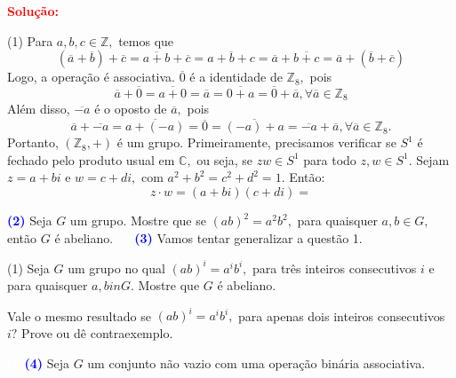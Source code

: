 \documentclass[12pt, a4paper]{article}
\newcommand{\negrito}[1]{\mbox{\boldmath{$#1$}}}
\begin{document}
\textbf{\textcolor{red}{Solução:}} 
\begin{tasks}[counter-format={(tsk[a])},label-width=3.6ex, label-format = {\bfseries}, column-sep = {0pt}](1)
\task[\textcolor{Floresta}{$\negrito{(a)} $}] Para $a,b,c \in \mathbb{Z},$ temos que
\[
(\overline{a} + \overline{b}) + \overline{c} = \overline{a+b} + \overline{c} = \overline{a+b+c} = \overline{a} + \overline{b+c} = \overline{a} + (\overline{b} + \overline{c})
\]
Logo, a operação é associativa. $\overline{0}$ é a identidade de $\mathbb{Z}_8,$ pois 
\[
\overline{a} + \overline{0} = \overline{a + 0} = \overline{a} = \overline{0 + a} = \overline{0} + \overline{a}, \forall \overline{a} \in \mathbb{Z}_8
\]
Além disso, $\overline{-a}$ é o oposto de $\overline{a},$ pois
\[
\overline{a} + \overline{-a} = \overline{a+(-a)} = \overline{0} = \overline{(-a)+a} = \overline{-a} + \overline{a}, \forall \overline{a} \in \mathbb{Z}_8.
\]
Portanto, $(\mathbb{Z}_8, +)$ é um grupo.
\task[\textcolor{Floresta}{$\negrito{(b)} $}] Primeiramente, precisamos verificar se $S^1$ é fechado pelo produto usual em $\mathbb{C},$ ou seja, se $zw \in S^1$ para todo $z, w \in S^1.$ Sejam $z = a + bi$ e $w = c + di,$ com $a^2 + b^2 = c^2 + d^2 = 1.$ Então:
\[
z \cdot w = (a+bi)(c+di) =  
\]
\end{tasks}
\textcolor{blue}{\bf(2)}\label{2} Seja $G$ um grupo. Mostre que se $(ab)^2 = a^2b^2,$ para quaisquer $a,b \in G,$ então $G$ é abeliano.
\textcolor{white}{Oi}\newline\newline
\textcolor{blue}{\bf(3)}\label{3} Vamos tentar generalizar a questão 1.
\begin{tasks}[counter-format={(tsk[a])},label-width=3.6ex, label-format = {\bfseries}, column-sep = {0pt}](1)
\task[\textcolor{Floresta}{$\negrito{(a)} $}] Seja $G$ um grupo no qual $(ab)^i = a^ib^i,$ para três inteiros consecutivos $i$ e para quaisquer $a,b in G.$ Mostre que $G$ é abeliano.

\task[\textcolor{Floresta}{$\negrito{(b)} $}] Vale o mesmo resultado se $(ab)^i = a^ib^i,$ para apenas dois inteiros consecutivos $i?$ Prove ou dê contraexemplo.
\end{tasks}
\textcolor{white}{Oi}\newline\newline
\textcolor{blue}{\bf(4)}\label{4} Seja $G$ um conjunto não vazio com uma operação binária associativa. 
\end{document}
